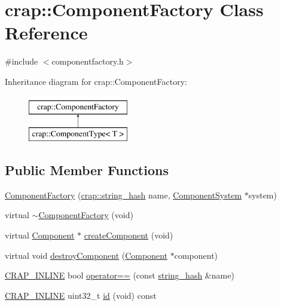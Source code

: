 \hypertarget{classcrap_1_1_component_factory}{}\section{crap\+:\+:Component\+Factory Class Reference}
\label{classcrap_1_1_component_factory}


{\ttfamily \#include $<$componentfactory.\+h$>$}

Inheritance diagram for crap\+:\+:Component\+Factory\+:\begin{figure}[H]
\begin{center}
\leavevmode
\includegraphics[height=2.000000cm]{classcrap_1_1_component_factory}
\end{center}
\end{figure}
\subsection*{Public Member Functions}
\begin{DoxyCompactItemize}
\item 
\hyperlink{classcrap_1_1_component_factory_a2067106296c050f902e4c4b648765888}{Component\+Factory} (\hyperlink{classcrap_1_1string__hash}{crap\+::string\+\_\+hash} name, \hyperlink{classcrap_1_1_component_system}{Component\+System} $\ast$system)
\item 
virtual \hyperlink{classcrap_1_1_component_factory_ad607d3f850eaaca2e70cbd1e8a46e661}{$\sim$\+Component\+Factory} (void)
\item 
virtual \hyperlink{classcrap_1_1_component}{Component} $\ast$ \hyperlink{classcrap_1_1_component_factory_ae81a2c74b72879a43fc715365d3c8d09}{create\+Component} (void)
\item 
virtual void \hyperlink{classcrap_1_1_component_factory_ad8b34d3eed2f0330ad49ea918bd56ba8}{destroy\+Component} (\hyperlink{classcrap_1_1_component}{Component} $\ast$component)
\item 
\hyperlink{config__x86_8h_a5a40526b8d842e7ff731509998bb0f1c}{C\+R\+A\+P\+\_\+\+I\+N\+L\+I\+N\+E} bool \hyperlink{classcrap_1_1_component_factory_ad96e0d69f3b7f916c5167483adbb00ca}{operator==} (const \hyperlink{classcrap_1_1string__hash}{string\+\_\+hash} \&name)
\item 
\hyperlink{config__x86_8h_a5a40526b8d842e7ff731509998bb0f1c}{C\+R\+A\+P\+\_\+\+I\+N\+L\+I\+N\+E} uint32\+\_\+t \hyperlink{classcrap_1_1_component_factory_af6852d2c1b96fe0026291a405bf8f24d}{id} (void) const 
\end{DoxyCompactItemize}


